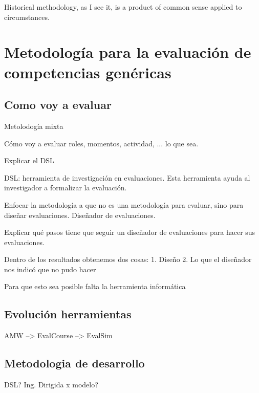 

\begin{savequote}[50mm]
Historical methodology, as I see it, is a product of common sense applied to circumstances. 
\end{savequote}


\chapter{Metodología para la evaluación de competencias genéricas}
\label{cha:Overall methodology}

\ifpdf
    \graphicspath{{3_overall_methodology/figures/PNG/}{3_overall_methodology/figures/PDF/}{3_overall_methodology/figures/}}
\else
    \graphicspath{{3_overall_methodology/figures/EPS/}{3_overall_methodology/figures/}}
\fi



\cite{turing1950computing}

\section{Como voy a evaluar}

Metolodogía mixta

Cómo voy a evaluar roles, momentos, actividad, ... lo que sea.

Explicar el DSL

DSL: herramienta de investigación en evaluaciones. Esta herramienta ayuda al investigador a formalizar la evaluación.

Enfocar la metodología a que no es una metodología para evaluar, sino para diseñar evaluaciones. Diseñador de evaluaciones.

Explicar qué pasos tiene que seguir un diseñador de evaluaciones para hacer sus evaluaciones.

Dentro de los resultados obtenemos dos cosas:
1. Diseño
2. Lo que el diseñador nos indicó que no pudo hacer

Para que esto sea posible falta la herramienta informática

\section{Evolución herramientas}

AMW --> EvalCourse --> EvalSim

\section{Metodologia de desarrollo}

DSL? Ing. Dirigida x modelo?




